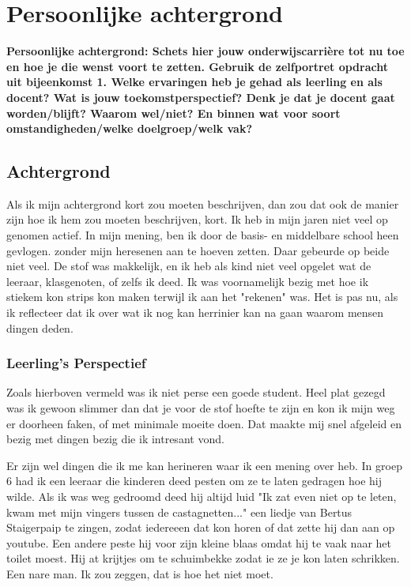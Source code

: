     \section{Persoonlijke achtergrond}
        \textbf{Persoonlijke achtergrond: Schets hier jouw onderwijscarrière tot nu toe en hoe je die wenst voort te zetten. Gebruik de zelfportret opdracht uit bijeenkomst 1. Welke ervaringen heb je gehad als leerling en als docent? Wat is jouw toekomstperspectief? Denk je dat je docent gaat worden/blijft? Waarom wel/niet? En binnen wat voor soort omstandigheden/welke doelgroep/welk vak?}

        \subsection{Achtergrond}
            Als ik mijn achtergrond kort zou moeten beschrijven, dan zou dat ook de manier zijn hoe ik hem zou moeten beschrijven, kort. Ik heb in mijn jaren niet veel op genomen actief. In mijn mening, ben ik door de basis- en middelbare school heen gevlogen. zonder mijn heresenen aan te hoeven zetten. Daar gebeurde op beide niet veel. De stof was makkelijk, en ik heb als kind niet veel opgelet wat de leeraar, klasgenoten, of zelfs ik deed. Ik was voornamelijk bezig met hoe ik stiekem kon strips kon maken terwijl ik aan het "rekenen" was. Het is pas nu, als ik reflecteer dat ik over wat ik nog kan herrinier kan na gaan waarom mensen dingen deden.
            
            \subsubsection{Leerling's Perspectief}
                Zoals hierboven vermeld was ik niet perse een goede student. Heel plat gezegd was ik gewoon slimmer dan dat je voor de stof hoefte te zijn en kon ik mijn weg er doorheen faken, of met minimale moeite doen. Dat maakte mij snel afgeleid en bezig met dingen bezig die ik intresant vond.

                \bigskip
        
                \noindent Er zijn wel dingen die ik me kan herineren waar ik een mening over heb. In groep 6 had ik een leeraar die kinderen deed pesten om ze te laten gedragen hoe hij wilde. Als ik was weg gedroomd deed hij altijd luid "Ik zat even niet op te leten, kwam met mijn vingers tussen de castagnetten..." een liedje van Bertus Staigerpaip te zingen, zodat iedereeen dat kon horen of dat zette hij dan aan op youtube. Een andere peste hij voor zijn kleine blaas omdat hij te vaak naar het toilet moest. Hij at krijtjes om te schuimbekke zodat ie ze je kon laten schrikken. Een nare man. Ik zou zeggen, dat is hoe het niet moet.

